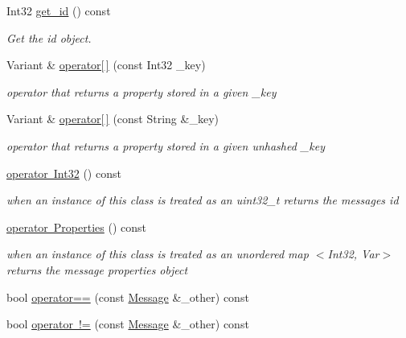 \begin{DoxyCompactItemize}
Int32 \mbox{\hyperlink{classbanita_1_1_message_ac28e1eb6fc91d5cd728bcdc398458d36}{get\+\_\+id}} () const
\begin{DoxyCompactList}\small\item\em Get the id object. \end{DoxyCompactList}\item 
Variant \& \mbox{\hyperlink{classbanita_1_1_message_a68cb40efc158cc95be690c2a0f78843e}{operator\mbox{[}$\,$\mbox{]}}} (const Int32 \+\_\+key)
\begin{DoxyCompactList}\small\item\em operator that returns a property stored in a given \+\_\+key \end{DoxyCompactList}\item 
Variant \& \mbox{\hyperlink{classbanita_1_1_message_afd7d83bc7864713a4e0654b39f633263}{operator\mbox{[}$\,$\mbox{]}}} (const String \&\+\_\+key)
\begin{DoxyCompactList}\small\item\em operator that returns a property stored in a given unhashed \+\_\+key \end{DoxyCompactList}\item 
\mbox{\hyperlink{classbanita_1_1_message_a0a586520c54ba6631e91f907ac6d0dc0}{operator Int32}} () const
\begin{DoxyCompactList}\small\item\em when an instance of this class is treated as an uint32\+\_\+t returns the message\textquotesingle{}s id \end{DoxyCompactList}\item 
\mbox{\hyperlink{classbanita_1_1_message_ae3d403e037b9c9b58ba11821f98b3489}{operator Properties}} () const
\begin{DoxyCompactList}\small\item\em when an instance of this class is treated as an unordered map $<$Int32, Var$>$ returns the message properties object \end{DoxyCompactList}\item 
bool \mbox{\hyperlink{classbanita_1_1_message_a14f6afe3532703912bab45350dbb848d}{operator==}} (const \mbox{\hyperlink{classbanita_1_1_message}{Message}} \&\+\_\+other) const
\item 
bool \mbox{\hyperlink{classbanita_1_1_message_a0eafd97ad4fbb72b96f464280c68bec5}{operator !=}} (const \mbox{\hyperlink{classbanita_1_1_message}{Message}} \&\+\_\+other) const
\end{DoxyCompactItemize}


